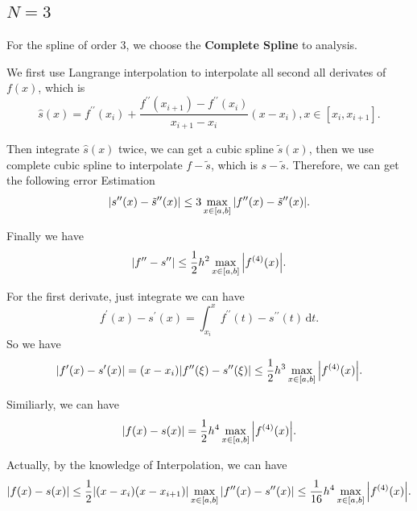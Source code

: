 \documentclass[a4paper]{article}
\begin{document}
\subsection{$N=3$}
For the spline of order $3$, we choose the \textbf{Complete Spline} to analysis. 

We first use Langrange interpolation to interpolate all second all derivates of $f(x)$, which is
\begin{equation}
    \hat{s}(x) = f^{\prime \prime}(x_i) + \frac{f^{\prime \prime} (x_{i+1}) - f^{\prime \prime}(x_i)}{x_{i+1}-x_i} (x-x_i), x \in [x_i, x_{i+1}].
\end{equation}

Then integrate $\hat{s}(x)$ twice, we can get a cubic spline $\tilde{s}(x)$, then we use complete cubic spline to interpolate 
$f - \tilde{s}$, which is $s - \tilde{s}$. Therefore, we can get the following error Estimation
\begin{equation}
    \abs{s^{\prime \prime}(x) - \tilde{s}^{\prime \prime}(x)} \leq 3 \max_{x \in [a,b]} \abs{f^{\prime \prime}(x) - \tilde{s}^{\prime \prime}(x)}.
\end{equation}

Finally we have 
\begin{equation}
    \abs{f^{\prime \prime} - s^{\prime \prime}} \leq \frac{1}{2} h^2 \max_{x \in [a,b]} \abs{f^{(4)}(x)}.
\end{equation}

For the first derivate, just integrate we can have
\begin{equation}
    f^{\prime}(x) - s^{\prime} (x) = \int_{x_i}^{x} f^{\prime \prime}(t) - s^{\prime \prime}(t) \, \mathrm{d}t.
\end{equation}
So we have 
\begin{equation}
    \abs{f^{\prime}(x) - s^{\prime} (x)} = (x - x_i) \abs{f^{\prime \prime}(\xi) - s^{\prime \prime}(\xi)} \leq \frac{1}{2} h^3 \max_{x \in [a,b]} \abs{f^{(4)}(x)}.
\end{equation}

Similiarly, we can have 
\begin{equation}
    \abs{f(x) - s(x)} = \frac{1}{2} h^4 \max_{x \in [a,b]} \abs{f^{(4)}(x)}.
\end{equation}

Actually, by the knowledge of Interpolation, we can have
\begin{equation}
    \abs{f(x) - s(x)} \leq \frac{1}{2} \abs{(x-x_i)(x-x_{i+1})} \max_{x \in [a,b]} \abs{f^{\prime \prime} (x) - s^{\prime \prime} (x)}
    \leq \frac{1}{16} h^4 \max_{x \in [a,b]} \abs{f^{(4)}(x)}.
\end{equation}
\end{document}
